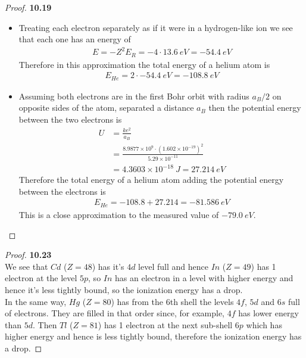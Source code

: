 \documentclass[11pt]{article}
\newcommand{\sci}[1]{\times 10^{#1}}
\theoremstyle{definition}
\begin{document}
\cleardoublepage
\begin{proof}{\textbf{10.19}}
\begin{itemize}
\item [\textbf{(a)}] Treating each electron separately as if it were in a
hydrogen-like ion we see that each one has an energy of
\begin{align*}
    E = -Z^2E_R = -4 \cdot 13.6~eV = -54.4~eV
\end{align*}
Therefore in this approximation the total energy of a helium atom is
\begin{align*}
    E_{He} = 2\cdot -54.4~eV = -108.8~eV
\end{align*}
\item [\textbf{(b)}] Assuming both electrons are in the first Bohr orbit with
radius $a_B/2$ on opposite sides of the atom, separated a distance $a_B$ then
the potential energy between the two electrons is
\begin{align*}
    U &= \frac{ke^2}{a_B}\\
    &= \frac{8.9877\sci{9} \cdot (1.602\sci{-19})^2}{5.29\sci{-11}}\\
    &= 4.3603\sci{-18}~J = 27.214~eV
\end{align*}
Therefore the total energy of a helium atom adding the potential energy between
the electrons is
\begin{align*}
    E_{He} = -108.8 + 27.214 = -81.586~eV
\end{align*}
This is a close approximation to the measured value of $-79.0~eV$. 
\end{itemize}
\end{proof}

\cleardoublepage
\begin{proof}{\textbf{10.23}}\\
We see that $Cd$ ($Z = 48$) has it's $4d$ level full and hence $In$ ($Z = 49$) 
has 1 electron at the level $5p$, so $In$ has an electron in a level
with higher energy and hence it's less tightly bound, so the ionization
energy has a drop.\\
In the same way, $Hg$ ($Z = 80$) has from the 6th shell the levels $4f$, $5d$ 
and $6s$ full of electrons. They are filled in that order since, for example,
$4f$ has lower energy than $5d$. Then $Tl$ ($Z = 81$) has 1 electron at the 
next sub-shell $6p$ which has higher energy and hence is less tightly bound,
therefore the ionization energy has a drop. 
\end{proof}
\end{document}

